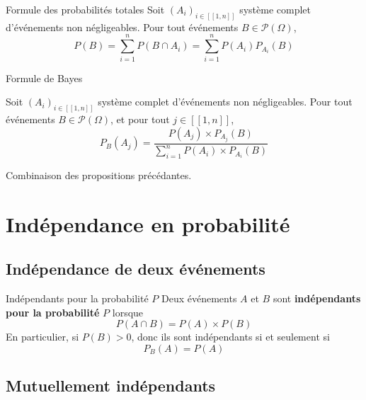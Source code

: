\begin{Prop}{Formule des probabilités totales}{}
  Soit $(A_i) _{i \in [\![1, n]\!]}$ système complet d'événements non négligeables. Pour tout événements $B \in \mathscr{P}(\Omega)$, 
  \begin{equation}
    P (B) = \sum_{i=1}^{n}P(B \cap A_i) = \sum_{i=1}^{n} P(A_i) P _{A_i}(B)
  \end{equation}

\end{Prop}

\begin{Theorem}{\color{red} Formule de Bayes}{}

  Soit $(A_i) _{i \in [\![1, n]\!]}$ système complet d'événements non négligeables. Pour tout événements $B \in \mathscr{P}(\Omega)$, et pour tout $j \in [\![1, n]\!]$, 
  \begin{equation}
    P_B( A_j) = \frac{P (A_j) \times P _{A_j}(B)}{ \sum_{i=1}^{n} P(A_i) \times P _{A_i}(B)} 
  \end{equation}
\end{Theorem}

\begin{myproof}{}{}
Combinaison des propositions précédantes.
\end{myproof}


\section{Indépendance en probabilité} %
\label{sec:Indépendance en probabilité}

\subsection{Indépendance de deux événements} %
\label{sub:Indépendance de deux événements}
\begin{Definition}[colbacktitle=red!75!black]{Indépendants pour la probabilité $P$}{}
Deux événements $A$ et $B$ sont \textbf{indépendants pour la probabilité} $P$ lorsque
\begin{equation}
  P(A \cap B) = P(A) \times P(B)
\end{equation} 
En particulier, si $P(B) >0$, donc ils sont indépendants si et seulement si 
\begin{equation}
  P_B(A) = P(A)
\end{equation}
\end{Definition}

\subsection{Mutuellement indépendants} %
\label{sub:Mutuellement indépendants}

